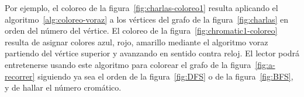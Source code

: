   Por ejemplo,
  el coloreo de la figura~\ref{fig:charlas-coloreo1}
  resulta aplicando el algoritmo~\ref{alg:coloreo-voraz}
  a los vértices del grafo de la figura~\ref{fig:charlas}
  en orden del número del vértice.
  El coloreo de la figura~\ref{fig:chromatic1-coloreo}
  resulta de asignar colores azul, rojo, amarillo
  mediante el algoritmo voraz
  partiendo del vértice superior
  y avanzando en sentido contra reloj.
  El lector podrá entretenerse usando este algoritmo
  para colorear el grafo de la figura~\ref{fig:a-recorrer}
  siguiendo ya sea el orden de la figura~\ref{fig:DFS}
  o de la figura~\ref{fig:BFS},
  y de hallar el número cromático.

